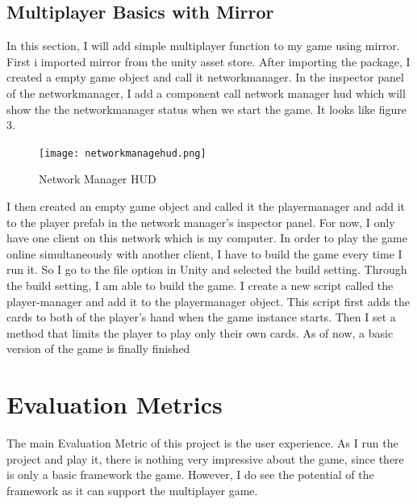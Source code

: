 \documentclass[10pt,twocolumn]{article}
\begin{document}
\subsection{Multiplayer Basics with Mirror}
In this section, I will add simple multiplayer function to my game using mirror. First i imported mirror from the unity asset store. After importing the package, I created a empty game object and call it networkmanager.  In the inspector panel of the networkmanager, I add a component call network manager hud which will show the the networkmanager status when we start the game. It looks like figure 3. 

\begin{figure}[ht]
  \texttt{[image: networkmanagehud.png]}
  \caption{Network Manager HUD}
  \label{fig:HUD}
\end{figure}

I then created an empty game object and called it the playermanager and add it to the player prefab in the network manager’s inspector panel. For now, I only have one client on this network which is my computer.  In order to play the game online simultaneously with another client, I have to build the game every time I run it. So I go to the file option in Unity and selected the build setting.  Through the build setting, I am able to build the game. 
	I create a new script called the player-manager and add it to the playermanager object. This script first adds the cards to both of the player’s hand when the game instance starts. Then I set a method that limits the player to play only their own cards. 
As of now, a basic version of the game is finally finished
\section{Evaluation Metrics}
The main Evaluation Metric of this project is the user experience. As I run the project and play it, there is nothing very impressive about the game, since there is only a basic framework the game. However, I do see the potential of the framework as it can support the multiplayer game. 
\end{document}
